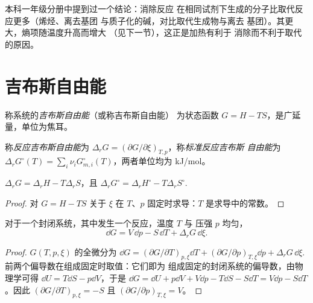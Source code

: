 本科一年级分册中提到过一个结论：消除反应
在相同试剂下生成的分子比取代反应更多（烯烃、离去基团
与质子化的碱，对比取代生成物与离去
基团）。其更大，熵项随温度升高而增大
（见下一节），这正是加热有利于
消除而不利于取代的原因。

\section{吉布斯自由能}

\begin{definition}[吉布斯自由能]\label{def:b2:reaction-free-energy:gibbs-energy}
称系统的\emph{吉布斯自由能}（或称吉布斯自由能）
为状态函数 $G = H - TS$，是广延量，单位为焦耳。
\end{definition}

\begin{definition}[反应吉布斯自由能]\label{def:b2:reaction-free-energy:reaction-gibbs}
称\emph{反应吉布斯自由能}为 $\Delta_r G
= (\partial G/\partial\xi)_{T,p}$，称\emph{标准反应吉布斯
自由能}为 $\Delta_r G^\circ(T) =
\sum_i\nu_iG^\circ_{m,i}(T)$，两者单位均为 \unit{kJ/mol}。
\end{definition}

\begin{proposition}[焓项与熵项]\label{prop:b2:reaction-free-energy:g-h-s}
$\Delta_r G = \Delta_r H - T\Delta_r S$，且 $\Delta_r G^\circ = \Delta_r
H^\circ - T\Delta_r S^\circ$.
\end{proposition}

\begin{proof}
对 $G = H - TS$ 关于 $\xi$ 在 $T$、$p$ 固定时求导：$T$
是求导中的常数。
\end{proof}

\begin{proposition}\label{prop:b2:reaction-free-energy:dG}
对于一个封闭系统，其中发生一个反应，温度 $T$ 与
压强 $p$ 均匀，
\[
  \dd G = V\,\dd p - S\,\dd T + \Delta_r G\,\dd\xi .
\]
\end{proposition}

\begin{proof}
$G(T, p, \xi)$ 的全微分为 $\dd G = (\partial G/\partial
T)_{p,\xi}\dd T + (\partial G/\partial p)_{T,\xi}\dd p + \Delta_r G\,\dd\xi$.
前两个偏导数在组成固定时取值：它们即为
组成固定的封闭系统的偏导数，由物理学可得
$\dd U = T\dd S - p\dd V$，于是 $\dd G = \dd U + p\dd V + V\dd p - T\dd S
- S\dd T = V\dd p - S\dd T$。因此 $(\partial G/\partial T)_{p,\xi} = -S$
且 $(\partial G/\partial p)_{T,\xi} = V$。
\end{proof}

